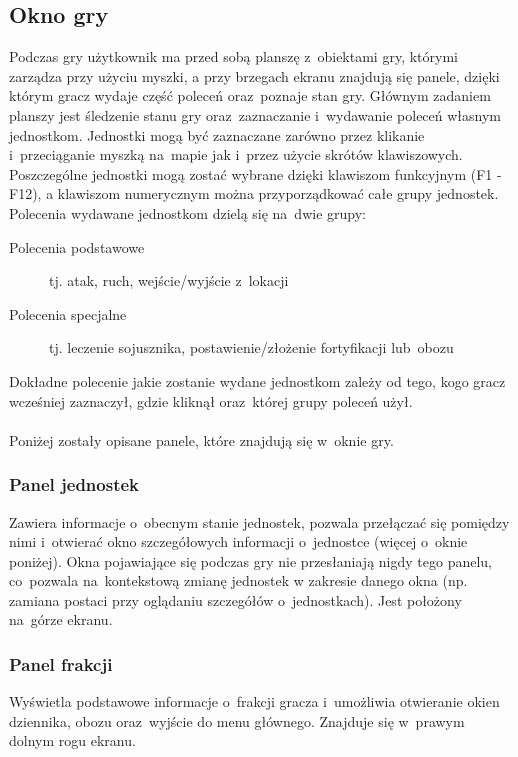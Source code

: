 \documentclass[licencjacka]{pracamgr}
\begin{document}
    \subsection{Okno gry}
      Podczas gry użytkownik ma przed sobą planszę z~obiektami gry, którymi zarządza przy użyciu myszki, a przy brzegach ekranu znajdują się panele,
      dzięki którym gracz wydaje część poleceń oraz~poznaje stan gry. Głównym zadaniem planszy jest śledzenie stanu gry oraz~zaznaczanie i~wydawanie poleceń
      własnym jednostkom. Jednostki mogą być zaznaczane zarówno przez klikanie i~przeciąganie myszką na~mapie jak i~przez użycie skrótów klawiszowych.
      Poszczególne jednostki mogą zostać wybrane dzięki klawiszom funkcyjnym (F1 - F12), a klawiszom numerycznym można przyporządkować całe grupy jednostek.
      Polecenia wydawane jednostkom dzielą się na~dwie grupy:
      \begin{description}
       \item[Polecenia podstawowe] tj. atak, ruch, wejście/wyjście z~lokacji
       \item[Polecenia specjalne] tj. leczenie sojusznika, postawienie/złożenie fortyfikacji lub~obozu
      \end{description}
      Dokładne polecenie jakie zostanie wydane jednostkom zależy od tego, kogo gracz wcześniej zaznaczył, gdzie kliknął oraz~której grupy poleceń użył.
      \\\ \\ \noindent
      Poniżej zostały opisane panele, które znajdują się w~oknie gry.

      \subsubsection{Panel jednostek}
	Zawiera informacje o~obecnym stanie jednostek, pozwala przełączać się pomiędzy nimi i~otwierać okno szczegółowych informacji o~jednostce
	(więcej o~oknie poniżej). Okna pojawiające się podczas gry nie przesłaniają nigdy tego panelu, co~pozwala na~kontekstową zmianę jednostek
	w zakresie danego okna (np. zamiana postaci przy oglądaniu szczegółów o~jednostkach). Jest położony na~górze ekranu.

      \subsubsection{Panel frakcji}
	Wyświetla podstawowe informacje o~frakcji gracza i~umożliwia otwieranie okien dziennika, obozu oraz~wyjście do menu głównego.
	Znajduje się w~prawym dolnym rogu ekranu.
\end{document}
